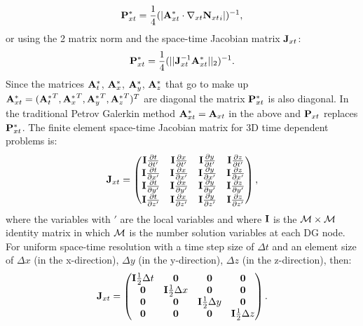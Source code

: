 \begin{equation}
 {\bf P}^*_{xt} = \frac{1}{4} (\vert {\bf A}_{xt}^* \cdot {\nabla_{xt}} {{\bf N}_{xt}}_i \vert )^{-1},
\label{P*-matrix}
\end{equation}
or using the 2 matrix norm and the space-time Jacobian matrix ${\bf J}_{xt}$:
\begin{equation}
 {\bf P}^*_{xt} = \frac{1}{4} (\vert\vert {\bf J}_{xt}^{-1} {\bf A}_{xt}^* \vert\vert_2 )^{-1} .
\label{p*-matrix-j}
\end{equation}
Since the matrices ${\bf A}^*_t$,  ${\bf A}^*_x$,    ${\bf A}^*_y$,    ${\bf A}^*_z$
that go to make up ${\bf A}_{xt}^* = ({{\bf A}^*_t}^T,  {{\bf A}^*_x}^T,    {{\bf A}^*_y}^T,    {{\bf A}^*_z}^T )^T$
are diagonal the matrix ${\bf P}^*_{xt}$ is also diagonal.
In the traditional Petrov Galerkin method ${\bf A}_{xt}^*={\bf A}_{xt}$ in the
 above and ${\bf P}_{xt}$ replaces ${\bf P}_{xt}^*$.
 The finite element space-time Jacobian matrix for 3D time dependent problems
 is:
\begin{equation}
 {\bf J}_{xt} =
  \begin{pmatrix}
 {\bf I} \frac{\partial t}{\partial t^\prime} &
 {\bf I} \frac{\partial x}{\partial t^\prime} &
 {\bf I} \frac{\partial y}{\partial t^\prime} &
 {\bf I} \frac{\partial z}{\partial t^\prime} \\
 {\bf I} \frac{\partial t}{\partial x^\prime} &
 {\bf I} \frac{\partial x}{\partial x^\prime} &
 {\bf I} \frac{\partial y}{\partial x^\prime} &
 {\bf I} \frac{\partial z}{\partial x^\prime} \\
 {\bf I} \frac{\partial t}{\partial y^\prime} &
 {\bf I} \frac{\partial x}{\partial y^\prime} &
 {\bf I} \frac{\partial y}{\partial y^\prime} &
 {\bf I} \frac{\partial z}{\partial y^\prime} \\
 {\bf I} \frac{\partial t}{\partial z^\prime} &
 {\bf I} \frac{\partial x}{\partial z^\prime} &
 {\bf I} \frac{\partial y}{\partial z^\prime} &
 {\bf I} \frac{\partial z}{\partial z^\prime}
  \end{pmatrix},
\label{J-matrix}
\end{equation}
 where the variables with $\prime$ are the local variables and
 where ${\bf I}$ is the ${\cal M}\times {\cal M}$ identity matrix
 in which ${\cal M}$ is the number solution variables at each DG node.
 For uniform space-time resolution with a time step size of $\Delta t$
 and an element size of
 $\Delta x$ (in the x-direction),
 $\Delta y$ (in the y-direction),
 $\Delta z$ (in the z-direction), then:
\begin{equation}
 {\bf J}_{xt} =
  \begin{pmatrix}
 {\bf I} \frac{1}{2}\Delta t &
 {\bf 0}  &
 {\bf 0}  &
 {\bf 0}  \\
 {\bf 0}  &
 {\bf I} \frac{1}{2}\Delta x &
 {\bf 0}  &
 {\bf 0}  \\
 {\bf 0}  &
 {\bf 0}  &
 {\bf I} \frac{1}{2}\Delta y &
 {\bf 0} \\
 {\bf 0}  &
 {\bf 0}  &
 {\bf 0}  &
 {\bf I} \frac{1}{2}\Delta z
  \end{pmatrix}.
\label{J-matrix-uniform}
\end{equation}
